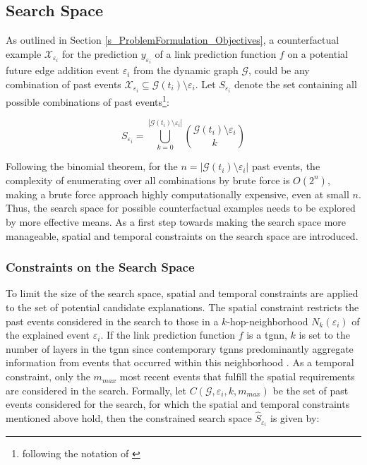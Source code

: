 \subsection{Search Space}
\label{s_Methodology_SearchSpace}



As outlined in Section \ref{s_ProblemFormulation_Objectives}, a counterfactual example $\mathcal{X}_{\varepsilon_i}$ for the prediction $y_{\varepsilon_i}$ of a link prediction function $f$ on a potential future edge addition event $\varepsilon_i$ from the dynamic graph $\mathcal{G}$, could be any combination of past events $\mathcal{X}_{\varepsilon_i} \subseteq \mathcal{G}(t_i) \setminus \varepsilon_i$. Let $S_{\varepsilon_i}$ denote the set containing all possible combinations of past events\footnote{following the notation of \cite{stanley_enumerative_1986}}:

\begin{equation}
    S_{\varepsilon_i} = \bigcup_{k = 0}^{|\mathcal{G}(t_i) \setminus \varepsilon_i|} {\mathcal{G}(t_i) \setminus \varepsilon_i \choose k}
\end{equation}

Following the binomial theorem, for the $n = |\mathcal{G}(t_i) \setminus \varepsilon_i|$ past events, the complexity of enumerating over all combinations by brute force is $O(2^n)$, making a brute force approach highly computationally expensive, even at small $n$. Thus, the search space for possible counterfactual examples needs to be explored by more effective means. As a first step towards making the search space more manageable, spatial and temporal constraints on the search space are introduced. 

\subsubsection{Constraints on the Search Space}
\label{s_Methodology_SearchSpace_Constraints}
To limit the size of the search space, spatial and temporal constraints are applied to the set of potential candidate explanations. The spatial constraint restricts the past events considered in the search to those in a $k$-hop-neighborhood $N_k(\varepsilon_i)$ of the explained event $\varepsilon_i$. If the link prediction function $f$ is a \gls{tgnn}, $k$ is set to the number of layers in the \gls{tgnn} since contemporary \glspl{tgnn} predominantly aggregate information from events that occurred within this neighborhood \cite{yuan_explainability_2021}. As a temporal constraint, only the $m_{max}$ most recent events that fulfill the spatial requirements are considered in the search. Formally, let $C(\mathcal{G}, \varepsilon_i, k, m_{max})$ be the set of past events considered for the search, for which the spatial and temporal constraints mentioned above hold, then the constrained search space $\hat{S}_{\varepsilon_i}$ is given by:

